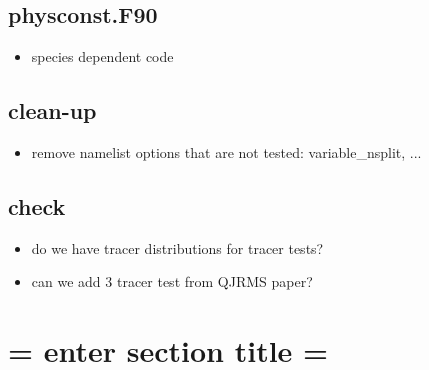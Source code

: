 \documentclass[draft]{agujournal2019}
\begin{document}
\subsection{physconst.F90}
\begin{itemize}
\item species dependent code
\end{itemize}
\subsection{clean-up}
\begin{itemize}
\item remove namelist options that are not tested: variable\_nsplit, ...
\end{itemize}
\subsection{check}
\begin{itemize}
\item do we have tracer distributions for tracer tests?
\item can we add 3 tracer test from QJRMS paper?
\end{itemize}
\section{= enter section title =}



\end{document}
